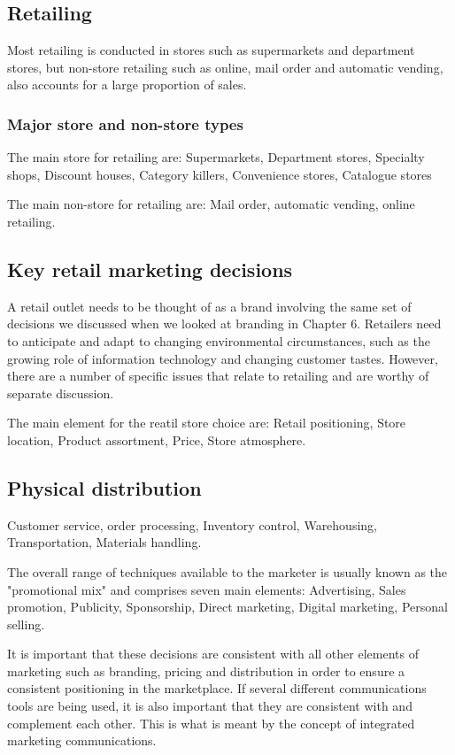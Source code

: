 \documentclass{article}
\begin{document}
\subsection{Retailing}
Most retailing is conducted in stores such as supermarkets and department stores, but non-store retailing such as online, mail order and automatic vending, also accounts for a large proportion of sales. 

\subsubsection{Major store and non-store types}
The main store for retailing are: Supermarkets, Department stores, Specialty shops, Discount houses, Category killers, Convenience stores, Catalogue stores

The main non-store for retailing are: Mail order, automatic vending, online retailing. 

\subsection{Key retail marketing decisions}
A retail outlet needs to be thought of as a brand involving the same set of decisions we discussed when we looked at branding in Chapter 6. Retailers need to anticipate and adapt to changing environmental circumstances, such as the growing role of information technology and changing customer tastes. However, there are a number of specific issues that relate to retailing and are worthy of separate discussion.

The main element for the reatil store choice are: Retail positioning, Store location, Product assortment, Price, Store atmosphere. 

\subsection{Physical distribution}
Customer service, order processing, Inventory control, Warehousing, Transportation, Materials handling.

The overall range of techniques available to the marketer is usually known as the "promotional mix" and comprises seven main elements: Advertising, Sales promotion, Publicity, Sponsorship, Direct marketing, Digital marketing, Personal selling.

It is important that these decisions are consistent with all other elements of marketing such as branding, pricing and distribution in order to ensure a consistent positioning in the marketplace. If several different communications tools are being used, it is also important that they are consistent with and complement each other. This is what is meant by the concept of integrated marketing communications.
\end{document}
